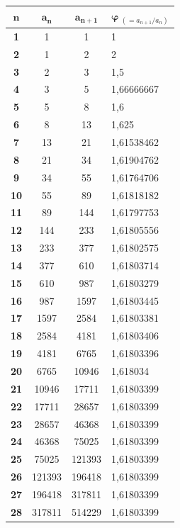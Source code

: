 \begin{longtable}[H]{|c|c|c|l|}
\hline
$\bm{n}$ & $\bm{a_n}$ & $\bm{a_{n+1}}$ & $\bm{\varphi} \ _{(= a_{n+1}/a_n)}$ \\ \hline\hline
\endhead
\textbf{1} & 1 & 1 & 1 \\ \hline
\textbf{2} & 1 & 2 & 2 \\ \hline
\textbf{3} & 2 & 3 & 1,5 \\ \hline
\textbf{4} & 3 & 5 & 1,66666667 \\ \hline
\textbf{5} & 5 & 8 & 1,6 \\ \hline
\textbf{6} & 8 & 13 & 1,625 \\ \hline
\textbf{7} & 13 & 21 & 1,61538462 \\ \hline
\textbf{8} & 21 & 34 & 1,61904762 \\ \hline
\textbf{9} & 34 & 55 & 1,61764706 \\ \hline
\textbf{10} & 55 & 89 & 1,61818182 \\ \hline
\textbf{11} & 89 & 144 & 1,61797753 \\ \hline
\textbf{12} & 144 & 233 & 1,61805556 \\ \hline
\textbf{13} & 233 & 377 & 1,61802575 \\ \hline
\textbf{14} & 377 & 610 & 1,61803714 \\ \hline
\textbf{15} & 610 & 987 & 1,61803279 \\ \hline
\textbf{16} & 987 & 1597 & 1,61803445 \\ \hline
\textbf{17} & 1597 & 2584 & 1,61803381 \\ \hline
\textbf{18} & 2584 & 4181 & 1,61803406 \\ \hline
\textbf{19} & 4181 & 6765 & 1,61803396 \\ \hline
\textbf{20} & 6765 & 10946 & 1,618034 \\ \hline
\textbf{21} & 10946 & 17711 & 1,61803399 \\ \hline
\textbf{22} & 17711 & 28657 & 1,61803399 \\ \hline
\textbf{23} & 28657 & 46368 & 1,61803399 \\ \hline
\textbf{24} & 46368 & 75025 & 1,61803399 \\ \hline
\textbf{25} & 75025 & 121393 & 1,61803399 \\ \hline
\textbf{26} & 121393 & 196418 & 1,61803399 \\ \hline
\textbf{27} & 196418 & 317811 & 1,61803399 \\ \hline
\textbf{28} & 317811 & 514229 & 1,61803399 \\ \hline

\end{longtable}
